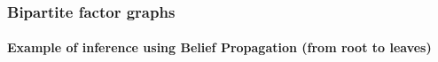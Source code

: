 \documentclass[slidestop,compress,mathserif]{beamer}
\begin{document}
  \begin{frame}
	\frametitle{Bipartite factor graphs}
    \framesubtitle{Example of inference using Belief Propagation (from root to leaves)}
\begin{center}

\end{center}
\end{frame}
\end{document}

